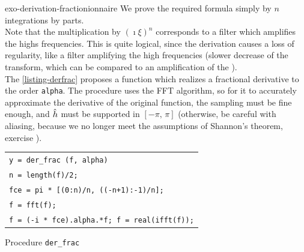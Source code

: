  
\begin{correction}{exo-derivation-fractionionnaire}
  We prove the required formula simply by $ n $ integrations by parts. \\Note that the multiplication by $ (\imath \xi)^n $ corresponds to a filter which amplifies the highs frequencies. This is quite logical, since the derivation causes a loss of regularity, like a filter amplifying the high frequencies (slower decrease of the transform, which can be compared to an amplification of the ). \\The \listingterme{} \Matlab{} \ref{listing-derfrac} proposes a function which realizes a fractional derivative to the order \texttt{\upshape alpha}. The procedure uses the FFT algorithm, so for it to accurately approximate the derivative of the original function, the sampling must be fine enough, and $ \hat{h} $ must be supported in $ [- \pi, \, \pi] $ (otherwise, be careful with aliasing, because we no longer meet the assumptions of Shannon's theorem, exercise ).

\begin{listing} 
\begin{footnotesize}
{\upshape
\begin{tabular}{l} \texttt{\pfunction y = der\_frac (f, alpha)} \\
\texttt{n = length(f)/2;} \\
\texttt{fce = pi * [(0:n)/n, ((-n+1):-1)/n];} \\
\texttt{f = fft(f);} \\
\texttt{f = (-i * fce).{\hatverb}alpha.*f; f = real(ifft(f));} \\
\end{tabular}
}
\end{footnotesize}
\caption{Procedure \texttt{\upshape der\_frac}}
\label{listing-derfrac}
\end{listing}
\end{correction}
 
